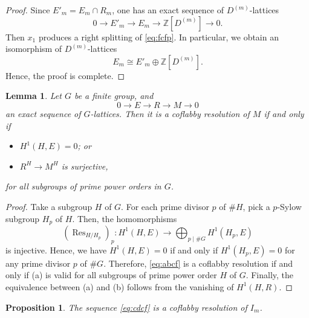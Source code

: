 \documentclass[12pt]{amsart}
\theoremstyle{plain}
\newtheorem{prop}[thm]{Proposition}
\newtheorem{lem}[thm]{Lemma}
\theoremstyle{definition}
\numberwithin{thm}{section}
\numberwithin{equation}{section}
\newcommand{\Z}{\mathbb{Z}}
\DeclareMathOperator{\Res}{Res}
\begin{document}
\begin{proof}
Since $E'_{m}=E_{m}\cap R_{m}$, one has an exact sequence of $D^{(m)}$-lattices
\begin{equation}\label{eq:fcfp}
0\rightarrow E'_{m}\rightarrow E_{m}\rightarrow \Z[D^{(m)}]\rightarrow 0. 
\end{equation}
Then $x_{1}$ produces a right splitting of \eqref{eq:fcfp}. In particular, we obtain an isomorphism of $D^{(m)}$-lattices
\begin{equation*}
E_{m}\cong E'_{m}\oplus \Z[D^{(m)}]. 
\end{equation*}
Hence, the proof is complete. 
\end{proof}

\begin{lem}\label{lem:flpp}
Let $G$ be a finite group, and
\begin{equation}\label{eq:abcf}
0\rightarrow E \rightarrow R \rightarrow M \rightarrow 0
\end{equation}
an exact sequence of $G$-lattices. Then it is a coflabby resolution of $M$ if and only if 
\begin{itemize}
    \item[(a)] $H^{1}(H,E)=0$; or
    \item[(b)] $R^{H}\rightarrow M^{H}$ is surjective,
\end{itemize}
for all subgroups of prime power orders in $G$. 
\end{lem}

\begin{proof}
Take a subgroup $H$ of $G$. For each prime divisor $p$ of $\#H$, pick a $p$-Sylow subgroup $H_{p}$ of $H$. Then, the homomorphisms
\begin{equation*}
    (\Res_{H/H_{p}})_{p}\colon H^{1}(H,E)\rightarrow \bigoplus_{p\mid \#G}H^{1}(H_{p},E)
\end{equation*}
is injective. Hence, we have $H^{1}(H,E)=0$ if and only if $H^{1}(H_{p},E)=0$ for any prime divisor $p$ of $\#G$. Therefore, \eqref{eq:abcf} is a coflabby resolution if and only if (a) is valid for all subgroups of prime power order $H$ of $G$. Finally, the equivalence between (a) and (b) follows from the vanishing of $H^{1}(H,R)$. 
\end{proof}

\begin{prop}\label{prop:cfcf}
The sequence \eqref{eq:cdcf} is a coflabby resolution of $I_{m}$. 
\end{prop}
\end{document}
